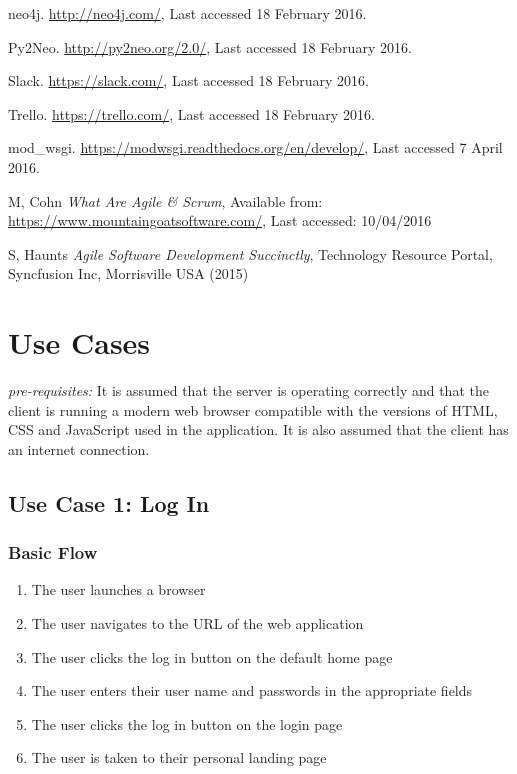 \documentclass[12pt,onecolumn]{article}
\begin{document}
\begin{thebibliography}{1}
		 neo4j. \url{http://neo4j.com/}, Last accessed 18 February 2016.
		
		 Py2Neo. \url{http://py2neo.org/2.0/}, Last accessed 18 February 2016.
		
		 Slack. \url{https://slack.com/}, Last accessed 18 February 2016.
		
		 Trello. \url{https://trello.com/}, Last accessed 18 February 2016.
		
		 mod\_wsgi. \url{https://modwsgi.readthedocs.org/en/develop/}, Last accessed 7 April 2016.
		
		
		 M, Cohn \emph{What Are Agile \& Scrum}, Available from: \url{https://www.mountaingoatsoftware.com/}, Last accessed: 10/04/2016
		
		 S, Haunts \emph{Agile Software Development Succinctly}, Technology Resource Portal, Syncfusion Inc, Morrisville USA (2015)
		
		
	\end{thebibliography}
	
	\newpage
	
	\appendix
	
	\section{Use Cases} \label{moreusecase}
	
	\emph{pre-requisites:} It is assumed that the server is operating correctly and that the client is running a modern web browser compatible with the versions of HTML, CSS and JavaScript used in the application. It is also assumed that the client has an internet connection.
	
	\subsection{Use Case 1: Log In}
	
	\subsubsection{Basic Flow}
	
	\begin{enumerate}
		\item The user launches a browser
		
		\item The user navigates to the URL of the web application
		
		\item The user clicks the log in button on the default home page
		
		\item The user enters their user name and passwords in the appropriate fields
		
		\item The user clicks the log in button on the login page
		
		\item The user is taken to their personal landing page
		
	\end{enumerate}
	
\end{document}
